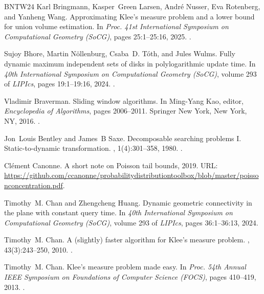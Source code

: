 \documentclass[11pt]{article}
\begin{document}
\begin{thebibliography}{BNTW24}
Karl Bringmann, Kasper~Green Larsen, Andr{\'{e}} Nusser, Eva Rotenberg, and
  Yanheng Wang.
\newblock Approximating {K}lee's measure problem and a lower bound for union
  volume estimation.
\newblock In {\em Proc. 41st International Symposium on Computational Geometry
  (SoCG)}, pages 25:1--25:16, 2025.
\newblock \href {https://doi.org/10.4230/LIPICS.SOCG.2025.25}
  {}.

Sujoy Bhore, Martin N{\"{o}}llenburg, Csaba~D. T{\'{o}}th, and Jules Wulms.
\newblock Fully dynamic maximum independent sets of disks in polylogarithmic
  update time.
\newblock In {\em 40th International Symposium on Computational Geometry
  (SoCG)}, volume 293 of {\em LIPIcs}, pages 19:1--19:16, 2024.
\newblock \href {https://doi.org/10.4230/LIPICS.SOCG.2024.19}
  {}.

Vladimir Braverman.
\newblock Sliding window algorithms.
\newblock In Ming-Yang Kao, editor, {\em Encyclopedia of Algorithms}, pages
  2006--2011. Springer New York, New York, NY, 2016.
\newblock \href {https://doi.org/10.1007/978-1-4939-2864-4_797}
  {}.

Jon~Louis Bentley and James~B Saxe.
\newblock Decomposable searching problems {I}. {S}tatic-to-dynamic
  transformation.
, 1(4):301--358, 1980.
\newblock \href {https://doi.org/10.1016/0196-6774(80)90015-2}
  {}.

Cl{\'e}ment Canonne.
\newblock A short note on {P}oisson tail bounds, 2019.
\newblock URL:
  \url{https://github.com/ccanonne/probabilitydistributiontoolbox/blob/master/poissonconcentration.pdf}.

Timothy~M. Chan and Zhengcheng Huang.
\newblock Dynamic geometric connectivity in the plane with constant query time.
\newblock In {\em 40th International Symposium on Computational Geometry
  (SoCG)}, volume 293 of {\em LIPIcs}, pages 36:1--36:13, 2024.

Timothy~M. Chan.
\newblock A (slightly) faster algorithm for {K}lee's measure problem.
, 43(3):243--250, 2010.
\newblock \href {https://doi.org/10.1016/J.COMGEO.2009.01.007}
  {}.

Timothy~M. Chan.
\newblock Klee's measure problem made easy.
\newblock In {\em Proc. 54th Annual IEEE Symposium on Foundations of Computer
  Science (FOCS)}, pages 410--419, 2013.
\newblock \href {https://doi.org/10.1109/FOCS.2013.51}
  {}.


\end{thebibliography}
\end{document}
